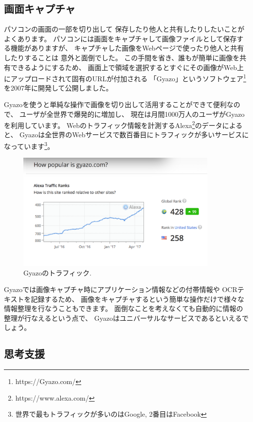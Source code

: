 \documentclass[topics]{compsoft} %
\begin{document}
\subsection{画面キャプチャ}

パソコンの画面の一部を切り出して
保存したり他人と共有したりしたいことがよくあります。
パソコンには画面をキャプチャして画像ファイルとして保存する機能がありますが、
キャプチャした画像をWebページで使ったり他人と共有したりすることは
意外と面倒でした。
この手間を省き、誰もが簡単に画像を共有できるようにするため、
画面上で領域を選択するとすぐにその画像がWeb上にアップロードされて固有のURLが付加される
「Gyazo」というソフトウェア\footnote{
  \textsf{https:{\slash}{\slash}Gyazo.com{\slash}}
}を2007年に開発して公開しました。

Gyazoを使うと単純な操作で画像を切り出して活用することができて便利なので、
ユーザが全世界で爆発的に増加し、
現在は月間1000万人のユーザがGyazoを利用しています。
%
Webのトラフィック情報を計測するAlexa\footnote{
  \textsf{https:{\slash}{\slash}www.alexa.com{\slash}}
}のデータによると、
Gyazoは全世界のWebサービスで数百番目にトラフィックが多いサービスになっています\footnote{
  世界で最もトラフィックが多いのはGoogle, 2番目はFacebook
}。

\begin{figure}[h]
  \includegraphics[width=10cm,bb=0 0 1134 668]{figures/2595e48e8346b423d6e6c1d23daf10f4.png}
  \caption{Gyazoのトラフィック.}
  \label{alexa}
\end{figure}

Gyazoでは画像キャプチャ時にアプリケーション情報などの付帯情報や
OCRテキストを記録するため、
画像をキャプチャするという簡単な操作だけで様々な情報整理を行なうこともできます。
面倒なことを考えなくても自動的に情報の整理が行なえるという点で、
Gyazoはユニバーサルなサービスであるといえるでしょう。

\subsection{思考支援}
\end{document}
